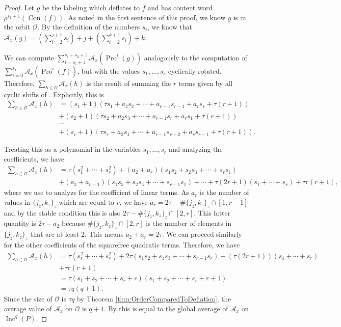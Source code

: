 \documentclass[11pt]{amsart}
\theoremstyle{definition}
\DeclareMathOperator{\Inc}{\mathrm{Inc}}
\DeclareMathOperator{\Pro}{\mathrm{Pro}}
\DeclareMathOperator{\Con}{\mathrm{Con}}
\begin{document}
\begin{proof}
Let $g$ be the labeling which deflates to $\overline{f}$ and has content word $\rho^{s_1+1}(\Con(f))$. As noted in the first sentence of this proof, we know $g$ is in the orbit $\mathcal{O}$.  By the definition of the numbers $s_i$,  we know that $\mathcal{A}_x(g) = (\sum_{i=2}^{j+1} s_i) + j + (\sum_{i=2}^{k+1} s_i) + k$.

We can compute $\sum_{i=s_1 + 1}^{s_1 + s_2 + 1} \mathcal{A}_x(\Pro^i(g))$ analogously to the computation of $\sum_{i=0}^{s_1} \mathcal{A}_x(\Pro^i(f))$, but with the values $s_1,\ldots,s_r$ cyclically rotated. Therefore, $\sum_{h \in \mathcal{O}} \mathcal{A}_x(h)$ is the result of summing the $r$ terms given by all cyclic shifts of . Explicitly, this is \begin{align*}
\sum_{h \in \mathcal{O}}\mathcal{A}_x(h) &= (s_1 + 1)(\tau s_1 + a_2 s_2 + \cdots + a_{r-1}s_{r-1} + a_rs_r + \tau (r+1))\\
& + (s_2 + 1)(\tau s_2 + a_2s_3 + \cdots + a_{r-1}s_r + a_r s_1 + \tau (r+1))\\
& \cdots \\
& +(s_r + 1)(\tau s_r + a_2 s_1 + \cdots + a_{r-1}s_{r-2} + a_rs_{r-1} + \tau (r+1)).
\end{align*}

Treating this as a polynomial in the variables $s_1,\ldots,s_r$ and analyzing the coefficients, we have \begin{align*}
\sum_{h \in \mathcal{O}} \mathcal{A}_x(h) &= \tau(s_1^2 + \cdots + s_r^2) + (a_2+a_r)(s_1s_2 + s_2s_3 + \cdots + s_rs_1) \\
&+ (a_3 + a_{r-1})(s_1s_3 + s_2s_4 + \cdots + s_{r-1}s_1) + \cdots
+ \tau(2r+1) (s_1 + \cdots + s_r) + \tau r (r+1),
\end{align*}
where we use  to analyze for the coefficient of linear terms. As $a_r$ is the number of values in $\{j_z,k_z\}_z$ which are equal to $r$, we have $a_r=2\tau - \# \{j_z,k_z\}_z \cap [1,r-1]$ and by the stable condition this is also $2\tau - \# \{j_z,k_z\}_z \cap [2,r]$. This latter quantity is $2\tau - a_2$ because $\# \{j_z,k_z\}_z \cap [2,r]$ is the number of elements in $\{j_z,k_z\}_z$ that are at least 2. This means $a_2 + a_r = 2\tau$. We can proceed similarly for the other coefficients of the squarefree quadratic terms. Therefore, we have \begin{align*}
\sum_{h\in\mathcal{O}}\mathcal{A}_x(h) &= \tau(s_1^2 + \cdots + s_r^2) + 2\tau(s_1s_2 + s_1s_3 + \cdots + s_{r-1}s_r) + (\tau(2r+1) )(s_1 + \cdots + s_r) \\&+ \tau r (r+1)\\
&= \tau (s_1 + s_2 + \cdots + s_r + r)(s_1 + s_2 + \cdots + s_r + r+1)\\
&= \tau q (q+1).
\end{align*}
Since the size of $\mathcal{O}$ is $\tau q$ by Theorem \ref{thm:OrderComparedToDeflation}, the average value of $\mathcal{A}_x$ on $\mathcal{O}$ is $q+1$. By  this is equal to the global average of $\mathcal{A}_x$ on $\Inc^q(P)$. 


\end{proof}
\end{document}
